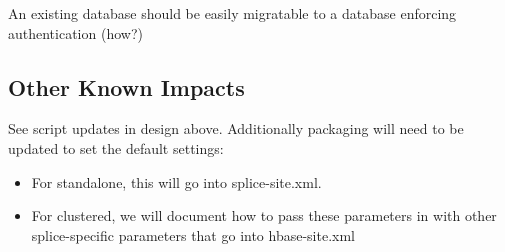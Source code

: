 \documentclass{article}
\begin{document}
An existing database should be easily migratable to a database enforcing authentication (how?)

\subsection{Other Known Impacts}

See script updates in design above.  Additionally packaging will need to be updated to set the default settings:
\begin{itemize}
\item For standalone, this will go into splice-site.xml.
\item For clustered, we will document how to pass these parameters in with other splice-specific parameters that go into hbase-site.xml
\end{itemize}
 
\end{document}
